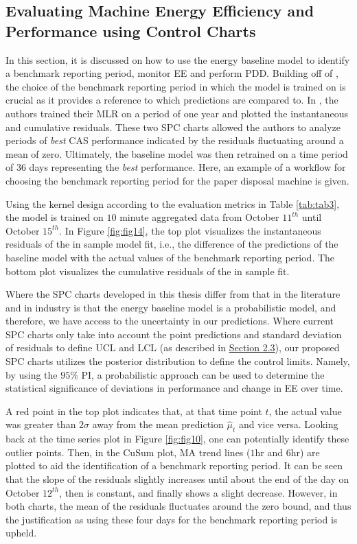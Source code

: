 \subsection{Evaluating Machine Energy Efficiency and Performance using Control Charts}

In this section, it is discussed on how to use the energy baseline model to identify a benchmark reporting period, monitor EE and perform PDD. Building off of \cite{oakland_statistical_2008}, the choice of the benchmark reporting period in which the model is trained on is crucial as it provides a reference to which predictions are compared to. In \cite{cas}, the authors trained their MLR on a period of one year and plotted the instantaneous and cumulative residuals. These two SPC charts allowed the authors to analyze periods of \textit{best} CAS performance indicated by the residuals fluctuating around a mean of zero. Ultimately, the baseline model was then retrained on a time period of $36$ days representing the \textit{best} performance. Here, an example of a workflow for choosing the benchmark reporting period for the paper disposal machine is given.

Using the kernel design according to the evaluation metrics in Table \ref{tab:tab3}, the model is trained on $10$ minute aggregated data from October $11^{th}$ until October $15^{th}$. In Figure \ref{fig:fig14}, the top plot visualizes the instantaneous residuals of the in sample model fit, i.e., the difference of the predictions of the baseline model with the actual values of the benchmark reporting period. The bottom plot visualizes the cumulative residuals of the in sample fit. 

Where the SPC charts developed in this thesis differ from that in the literature and in industry is that the energy baseline model is a probabilistic model, and therefore, we have access to the uncertainty in our predictions. Where current SPC charts only take into account the point predictions and standard deviation of residuals to define UCL and LCL (as described in \hyperlink{subsection.2.3}{Section 2.3}), our proposed SPC charts utilizes the posterior distribution to define the control limits. Namely, by using the $95\%$ PI, a probabilistic approach can be used to determine the statistical significance of deviations in performance and change in EE over time. 

A red point in the top plot indicates that, at that time point $t$, the actual value was greater than $2 \sigma$ away from the mean prediction $\hat{\mu}_t$ and vice versa. Looking back at the time series plot in Figure \ref{fig:fig10}, one can potentially identify these outlier points. Then, in the CuSum plot, MA trend lines ($1$hr and $6$hr) are plotted to aid the identification of a benchmark reporting period. It can be seen that the slope of the residuals slightly increases until about the end of the day on October $12^{th}$, then is constant, and finally shows a slight decrease. However, in both charts, the mean of the residuals fluctuates around the zero bound, and thus the justification as using these four days for the benchmark reporting period is upheld.

